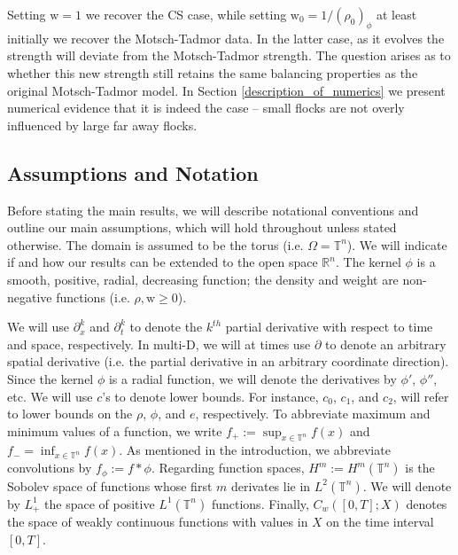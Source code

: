 \documentclass[11pt,letterpaper]{amsart}
\theoremstyle{plain}
\theoremstyle{definition}
\theoremstyle{remark}
\newcommand{\R}{\ensuremath{\mathbb{R}}}   %
\newcommand{\T}{\ensuremath{\mathbb{T}}}   %
\renewcommand{\geq}{\geqslant}
\def\R{\mathbb{R}}
\def\T{\mathbb{T}}
\def \st {\mathrm{s}}
\def \wt {\mathrm{w}}
\begin{document}
Setting $\wt =1$ we recover the CS case, while setting $\wt_0 = 1/({\rho_0})_{\phi}$ at least initially we recover the Motsch-Tadmor data. In the latter case, as it evolves the strength will deviate from the Motsch-Tadmor strength. 
The question arises as to whether this new strength still retains the same balancing properties as the original Motsch-Tadmor model. In Section \ref{description_of_numerics} we present numerical evidence that it is indeed the case -- 
small flocks are not overly influenced by large far away flocks. 


\subsection{Assumptions and Notation}
Before stating the main results, we will describe notational conventions and outline our main assumptions, which will hold throughout 
unless stated otherwise.
The domain is assumed to be the torus (i.e. $\Omega = \T^n$). We will indicate if and how our results can be extended to the open space $\R^n$.
The kernel $\phi$ is a smooth, positive, radial, decreasing function; the density and weight are non-negative functions (i.e. $\rho, \wt \geq 0$). 

We will use $\partial^k_x$ and $\partial^k_t$ to denote the $k^{th}$ partial derivative with respect to time and space, respectively. 
In multi-D, we will at times use $\partial$ to denote an arbitrary spatial derivative (i.e. the partial derivative in an arbitrary 
coordinate direction).  Since the kernel $\phi$ is a radial function, we will denote the derivatives by $\phi'$, $\phi''$, etc. 
We will use $c$'s to denote lower bounds.  For instance, $c_0$, $c_1$, and $c_2$, will refer to lower bounds on the $\rho$, $\phi$, 
and $e$, respectively. To abbreviate maximum and minimum values of a function, we write $f_+ := \sup_{x \in \T^n} f(x)$ and $f_- = \inf_{x \in \T^n} f(x)$.
As mentioned in the introduction, we abbreviate convolutions by $f_{\phi} := f \ast \phi$.
Regarding function spaces, $H^m := H^m(\T^n)$ is the Sobolev space of functions whose first $m$ derivates lie in $L^2(\T^n)$.  
We will denote by $L^1_+$ the space of positive $L^1(\T^n)$ functions.  Finally, $C_w([0,T]; X)$ denotes the space of weakly continuous functions with values in $X$ on the time interval $[0,T]$. 
\end{document}
